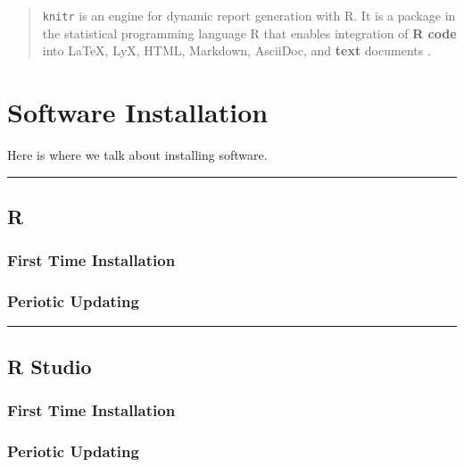 \documentclass[]{book}
\begin{document}
\begin{quote}
\texttt{knitr} is an engine for dynamic report generation with R. It is
a package in the statistical programming language R that enables
integration of \textbf{R code} into LaTeX, LyX, HTML, Markdown,
AsciiDoc, and \textbf{text} documents \citep{R-knitr}.
\end{quote}

\chapter{Software Installation}\label{software-installation}

Here is where we talk about installing software.

\begin{center}\rule{0.5\linewidth}{\linethickness}\end{center}

\section{R}\label{r}

\subsection{First Time Installation}\label{first-time-installation}

\subsection{Periotic Updating}\label{periotic-updating}

\begin{center}\rule{0.5\linewidth}{\linethickness}\end{center}

\section{R Studio}\label{r-studio}

\subsection{First Time Installation}\label{first-time-installation-1}

\subsection{Periotic Updating}\label{periotic-updating-1}
\end{document}
